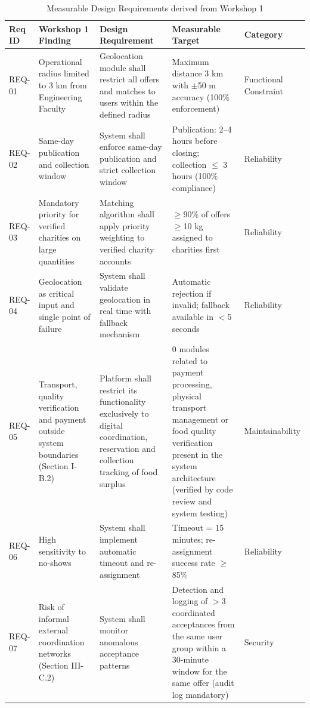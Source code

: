 \documentclass[conference]{IEEEtran}
\begin{document}
\begin{table}[ht]
\centering
\footnotesize
\caption{Measurable Design Requirements derived from Workshop 1}
\label{tab:requirements}
\begin{tabular}{p{1.1cm} p{3.0cm} p{4.0cm} p{4.0cm} p{1.8cm}}
\toprule
\textbf{Req ID} & \textbf{Workshop 1 Finding} & \textbf{Design Requirement} & \textbf{Measurable Target} & \textbf{Category} \\
\midrule
REQ-01 & Operational radius limited to 3 km from Engineering Faculty & Geolocation module shall restrict all offers and matches to users within the defined radius & Maximum distance 3 km with $\pm$50 m accuracy (100\% enforcement) & Functional Constraint \\[4pt]
REQ-02 & Same-day publication and collection window & System shall enforce same-day publication and strict collection window & Publication: 2–4 hours before closing; collection $\leq$ 3 hours (100\% compliance) & Reliability \\[4pt]
REQ-03 & Mandatory priority for verified charities on large quantities & Matching algorithm shall apply priority weighting to verified charity accounts & $\geq$90\% of offers $\geq$10 kg assigned to charities first & Reliability \\[4pt]
REQ-04 & Geolocation as critical input and single point of failure & System shall validate geolocation in real time with fallback mechanism & Automatic rejection if invalid; fallback available in $<$5 seconds & Reliability \\[4pt]
REQ-05 & Transport, quality verification and payment outside system boundaries (Section I-B.2) & Platform shall restrict its functionality exclusively to digital coordination, reservation and collection tracking of food surplus & 0 modules related to payment processing, physical transport management or food quality verification present in the system architecture (verified by code review and system testing) & Maintainability \\[4pt]
REQ-06 & High sensitivity to no-shows & System shall implement automatic timeout and re-assignment & Timeout = 15 minutes; re-assignment success rate $\geq$85\% & Reliability \\[4pt]
REQ-07 & Risk of informal external coordination networks (Section III-C.2) & System shall monitor anomalous acceptance patterns & Detection and logging of $>$3 coordinated acceptances from the same user group within a 30-minute window for the same offer (audit log mandatory) & Security \\[4pt]

\end{tabular}
\end{table}
\end{document}
